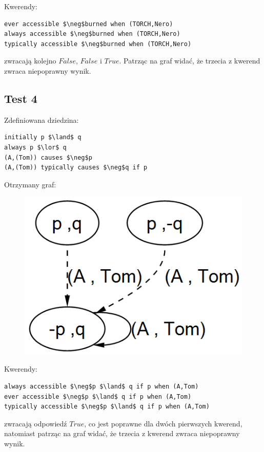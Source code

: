 \documentclass{article}
\begin{document}
Kwerendy:
\begin{lstlisting}[mathescape=true]
ever accessible $\neg$burned when (TORCH,Nero)
always accessible $\neg$burned when (TORCH,Nero)
typically accessible $\neg$burned when (TORCH,Nero)
\end{lstlisting}
zwracają kolejno $False$, $False$ i $True$. Patrząc na graf widać, że trzecia z kwerend zwraca niepoprawny wynik.


\subsection{Test 4}
Zdefiniowana dziedzina:
\bigskip
{}
\begin{lstlisting}[mathescape=true]
initially p $\land$ q
always p $\lor$ q 
(A,(Tom)) causes $\neg$p
(A,(Tom)) typically causes $\neg$q if p
\end{lstlisting}
\vspace{1cm}

Otrzymany graf:
\begin{figure}[H]
	\centering
	\includegraphics[scale=0.6]{test4_graf}
\end{figure}

Kwerendy:
\begin{lstlisting}[mathescape=true]
always accessible $\neg$p $\land$ q if p when (A,Tom)
ever accessible $\neg$p $\land$ q if p when (A,Tom)
typically accessible $\neg$p $\land$ q if p when (A,Tom)
\end{lstlisting}
zwracają odpowiedź $True$, co jest poprawne dla dwóch pierwszych kwerend, natomiast patrząc na graf widać, że trzecia z kwerend zwraca niepoprawny wynik.
\end{document}

